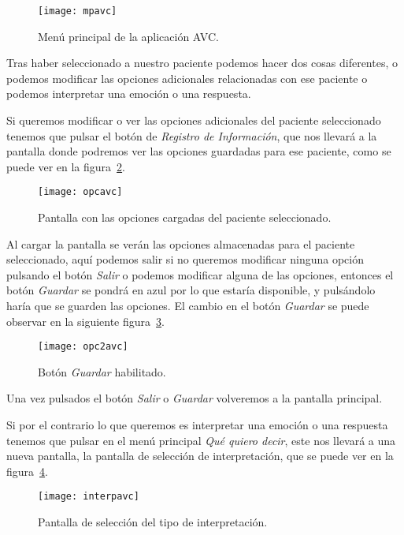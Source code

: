 \begin{figure}[H]
	\centering
	\texttt{[image: mpavc]}
	\caption{Menú principal de la aplicación AVC.}
	\label{fig:mpavc}
\end{figure}

Tras haber seleccionado a nuestro paciente podemos hacer dos cosas diferentes, o podemos modificar las opciones adicionales relacionadas con ese paciente o podemos interpretar una emoción o una respuesta.

Si queremos modificar o ver las opciones adicionales del paciente seleccionado tenemos que pulsar el botón de \textit{Registro de Información}, que nos llevará a la pantalla donde podremos ver las opciones guardadas para ese paciente, como se puede ver en la figura~\ref{fig:opcavc}.

\begin{figure}[H]
	\centering
	\texttt{[image: opcavc]}
	\caption{Pantalla con las opciones cargadas del paciente seleccionado.}
	\label{fig:opcavc}
\end{figure}

Al cargar la pantalla se verán las opciones almacenadas para el paciente seleccionado, aquí podemos salir si no queremos modificar ninguna opción pulsando el botón \textit{Salir} o podemos modificar alguna de las opciones, entonces el botón \textit{Guardar} se pondrá en azul por lo que estaría disponible, y pulsándolo haría que se guarden las opciones. El cambio en el botón \textit{Guardar} se puede observar en la siguiente figura~\ref{fig:opc2avc}.

\begin{figure}[H]
	\centering
	\texttt{[image: opc2avc]}
	\caption{Botón \textit{Guardar} habilitado.}
	\label{fig:opc2avc}
\end{figure}

Una vez pulsados el botón \textit{Salir} o \textit{Guardar} volveremos a la pantalla principal.

Si por el contrario lo que queremos es interpretar una emoción o una respuesta tenemos que pulsar en el menú principal \textit{Qué quiero decir}, este nos llevará a una nueva pantalla, la pantalla de selección de interpretación, que se puede ver en la figura~\ref{fig:interpavc}.

\begin{figure}[H]
	\centering
	\texttt{[image: interpavc]}
	\caption{Pantalla de selección del tipo de interpretación.}
	\label{fig:interpavc}
\end{figure}

